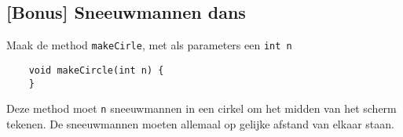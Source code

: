 \subsection{[Bonus] Sneeuwmannen dans}
Maak de method \texttt{makeCirle}, met als parameters een \texttt{int n}
\begin{lstlisting}
    void makeCircle(int n) {
    }
\end{lstlisting}
Deze method moet \texttt{n} sneeuwmannen in een cirkel om het midden van het scherm tekenen. De sneeuwmannen moeten allemaal op gelijke afstand van elkaar staan.


